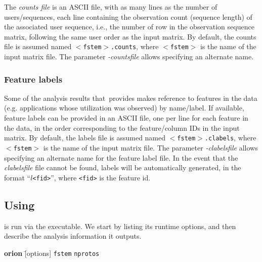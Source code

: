 \documentclass[]{article}
\def\inputf{{\tt$<$fstem$>$}\xspace}
\begin{document}
The \emph{counts file} is an ASCII file, with as many lines as the number of
users/sequences, each line containing the observation count (sequence length) of
the associated user sequence, i.e., the number of row in the observation
sequence matrix, following the same user order as the input matrix.
By default, the counts file is assumed named {\tt$<$fstem$>$.counts}, where
{\tt$<$fstem$>$} is the name of the input matrix file. The parameter
\emph{-countsfile} allows specifying an alternate name.

\subsubsection{Feature labels}
\label{sec:usage:iformat:clabels}

Some of the analysis results that~\orion provides makes reference to features
in the data (e.g. applications whose utilization was observed) by name/label. If available,
feature labels can be provided in an ASCII file, one per line for each feature
in the data, in the order corresponding to the feature/column IDs in the input
matrix. By default, the labels file is assumed named {\tt$<$fstem$>$.clabels},
where \inputf is the name of the input matrix file. The parameter
\emph{-clabelsfile} allows specifying an alternate name for the feature
label file. In the event that the \emph{clabelsfile} file cannot be found,
labels will be automatically generated, in the format ``$l${\tt<fid>}'', where
{\tt<fid>} is the feature id.


\subsection{Using \orion}
\label{sec:usage:orion}

\orion is run via the \orionp executable. We start by listing its
runtime options, and then describe the analysis information it outputs.

\begin{tabbing}
{\sf\bf orion} \= [options] {\tt fstem} {\tt nprotos}
\end{tabbing}
\end{document}
